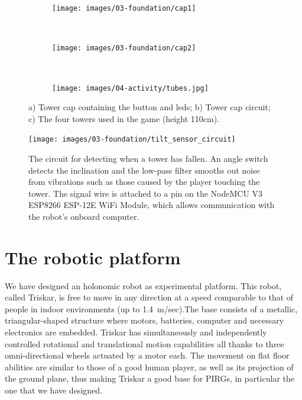 \begin{figure}[H]
  \centering
  \begin{subfigure}[t]{0.33\textwidth}
  	\centering
    \texttt{[image: images/03-foundation/cap1]}
	\caption{}
  \end{subfigure}
  ~ 
  \begin{subfigure}[t]{0.33\textwidth}
  	\centering
    \texttt{[image: images/03-foundation/cap2]}
	\caption{}
  \end{subfigure}
  ~
   \begin{subfigure}[b]{0.33\textwidth}
	  \centering
      \texttt{[image: images/04-activity/tubes.jpg]}
      \caption{}
    \end{subfigure}
  \caption{a) Tower cap containing the button and \gls{led}s; b) Tower cap circuit; c) The four towers used in the game (height 110cm).}
  \label{fig:tower_caps}
\end{figure}


\begin{figure}[H]
	\centering
		\texttt{[image: images/03-foundation/tilt\_sensor\_circuit]}
	\caption{The circuit for detecting when a tower has fallen. An angle switch detects the inclination and the low-pass filter smooths out noise from vibrations such as those caused by the player touching the tower. The signal wire is attached to a pin on the NodeMCU V3 ESP8266 ESP-12E WiFi Module, which allows communication with the robot's onboard computer.}
    \label{fig:tilt_circuit} 
\end{figure}

\section{The robotic platform}\label{sec:roboplat} 
We have designed an holonomic robot as experimental platform. This robot, called Triskar, is free to move in any direction at a speed comparable to that of people in indoor environments (up to 1.4~m/sec).The base consists of a metallic, triangular-shaped structure where motors, batteries, computer and necessary electronics are embedded. Triskar has simultaneously and independently controlled rotational and translational motion capabilities all thanks to three omni-directional wheels actuated by a motor each. The movement on flat floor abilities are similar to those of a good human player, as well as its projection of the ground plane, thus making Triskar a good base for PIRGs, in particular the one that we have designed. 

